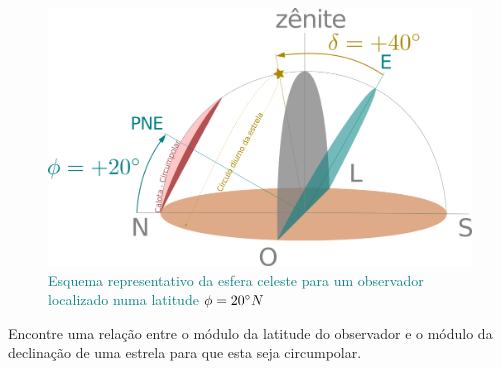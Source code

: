 \newpage
\begin{sol}
	\textcolor{teal} {
		\begin{figure}[!ht]
			\centering
			\includegraphics[width=.75\linewidth]{fig/fig-q4.png}
			\caption{Esquema representativo da esfera celeste para um observador localizado numa latitude $\phi=20^{\circ}N$}
			\label{fig:fig-ex4}
		\end{figure}
	}
\end{sol}
\begin{prob}[ref: P15]
	Encontre uma relação entre o módulo da latitude do observador e o módulo da declinação de
	uma estrela para que esta seja circumpolar.	
\end{prob}

